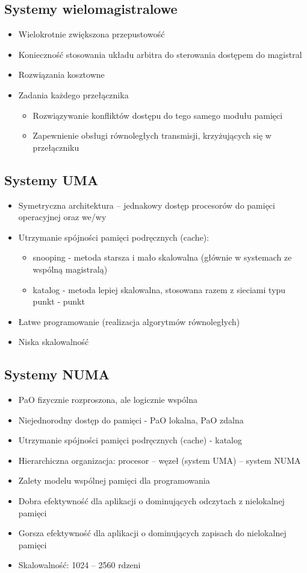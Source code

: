 \documentclass[a4paper,twoside]{article}
\begin{document}
		\subsection*{Systemy wielomagistralowe}
		\begin{itemize}
			\item Wielokrotnie zwiększona przepustowość
			\item Konieczność stosowania układu arbitra do sterowania dostępem do magistral
			\item Rozwiązania kosztowne
			\item Zadania każdego przełącznika
			\begin{itemize}
				\item Rozwiązywanie konfliktów dostępu do tego samego modułu pamięci
				\item Zapewnienie obsługi równoległych transmisji, krzyżujących się w przełączniku
			\end{itemize}
		\end{itemize}
		\subsection*{Systemy UMA}
		\begin{itemize}
			\item Symetryczna architektura – jednakowy dostęp procesorów do pamięci operacyjnej oraz we/wy
			\item Utrzymanie spójności pamięci podręcznych (cache):
			\begin{itemize}
				\item snooping - metoda starsza i mało skalowalna (głównie w systemach ze wspólną magistralą)
				\item katalog - metoda lepiej skalowalna, stosowana razem z sieciami typu punkt - punkt
			\end{itemize}
			\item Łatwe programowanie (realizacja algorytmów równoległych)
			\item Niska skalowalność
		\end{itemize}
		\subsection*{Systemy NUMA}
		\begin{itemize}
			\item PaO fizycznie rozproszona, ale logicznie wspólna
			\item Niejednorodny dostęp do pamięci - PaO lokalna, PaO zdalna
			\item Utrzymanie spójności pamięci podręcznych (cache) - katalog
			\item Hierarchiczna organizacja: procesor – węzeł (system UMA) – system NUMA
			\item Zalety modelu wspólnej pamięci dla programowania
			\item Dobra efektywność dla aplikacji o dominujących odczytach z nielokalnej pamięci
			\item Gorsza efektywność dla aplikacji o dominujących zapisach do nielokalnej pamięci
			\item Skalowalność: 1024 – 2560 rdzeni
		\end{itemize}
\end{document}
